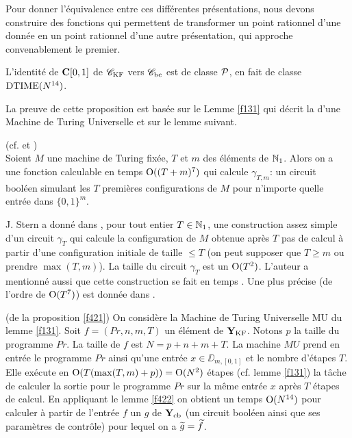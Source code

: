 Pour donner l'équivalence entre ces différentes présentations, nous devons 
construire des fonctions qui permettent de transformer un point rationnel d'une 
\pres donnée en un point rationnel d'une autre présentation, qui approche 
convenablement le premier.

\begin{fproposition} \label{f421}
L'identité de  ${{\bf C}[0,1]}$  de  ${{{\mathscr C}}_{\rm KF}}$  vers  ${{{\mathscr C}}_{\rm bc}}$  est \uni de classe  ${\cal P}$,  en 
fait de classe  ${\rm DTIME} (N^{14})$.
\end{fproposition}

La preuve de cette proposition est basée sur le Lemme \ref{f131} qui décrit 
la \com d'une Machine de Turing Universelle et sur le lemme suivant.

\begin{flemma} \label{f422}
{\rm (cf. \cite{fSt} et \cite{fMo}) }  \\
Soient $ M $ une machine de Turing fixée, $ T $ et $ m $ des éléments de 
$\mathbb {N}_1$. Alors on a une fonction calculable en temps ${\rm O}((T+m)^7)$  qui calcule  
$\gamma_{T,m}$:  un circuit booléen simulant les $ T $ premières 
configurations de $ M $ pour n'importe quelle entrée dans  $\{0,1\}^m$.
\end{flemma} 

\begin{fremark} \label{f423}
J. Stern a donné dans \cite {fSt}, pour tout entier $T \in \mathbb {N}_1$, une 
construction assez simple d'un circuit  $\gamma_T$  qui calcule la configuration 
de $ M $ obtenue après $ T $ pas de calcul à partir d'une configuration 
initiale de taille $\leq  T$  (on peut supposer que $T \geq  m$ ou prendre 
$\max(T,m)$). La taille du circuit  $\gamma_T$  est un  ${\rm O}(T^2)$. L'auteur a 
mentionné aussi que cette construction se fait en temps \poll. Une \com 
plus précise (de l'ordre de  ${\rm O}(T^7)$) est donnée dans \cite{fMo}.
\end{fremark}

\proof (de la proposition \ref{f421})	On considère la Machine de Turing 
Universelle MU du lemme \ref{f131}.  Soit $ f = (Pr,n,m,T) $ un élément de  
${{\bf Y}_{\rm KF}}$.  Notons $ p $ la taille du programme $Pr.$ 
La taille de  $f$ est $N = p+n+m+T.$  La machine $ MU $ prend en entrée le 
programme $ Pr $  ainsi qu'une entrée
 $ x \in  \DD_{m,[0,1]}$  et le nombre d'étapes $ T.$ 
Elle exécute en ${\rm O}(T (\max(T,m)+p)) = {\rm O}(N^2)$ étapes (cf. lemme \ref{f131})  
la tâche de calculer la sortie pour le programme $ Pr $ sur la même entrée 
$x$ après $ T $ étapes de calcul.  
En appliquant le lemme \ref{f422}  on obtient un temps  ${\rm O}(N^{14})$  pour 
calculer à partir de l'entrée $f$ un \elem $ g $ de  ${{\bf Y}_{\rm cb}}$  
(un circuit booléen ainsi que ses paramètres de contrôle)  
pour lequel on a 
$ \widetilde{g} = \widetilde{f}$.
	\eop

